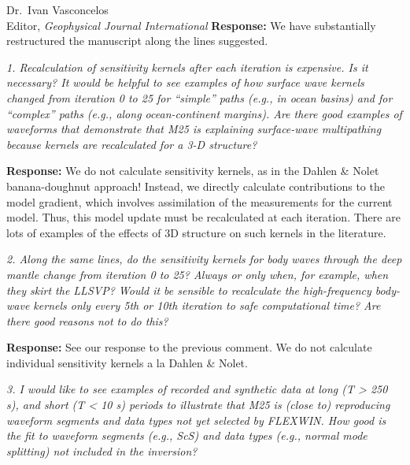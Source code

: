 \documentclass[11pt,a4paper]{letter}
\newcommand{\cyan}[1]{\textbf{\textcolor{Cyan}{#1}}}
\newcommand{\orange}[1]{\textbf{\textcolor{Orange}{#1}}}
\newcommand{\toebru}[1]{\textbf{\cyan{*** Ebru: #1 ***}}}
\newcommand{\fromebru}[1]{\textbf{\orange{*** Ebru: #1 ***}}}
\newcommand{\response}[1]{\textbf{Response:} #1}
\newcommand{\rev}[1]{{\it{#1}}}
\begin{document}
\begin{letter}{Dr.~Ivan Vasconcelos\\
Editor, \textit{Geophysical Journal International}}
\response{We have substantially restructured the manuscript along the lines suggested.}

\rev{1. Recalculation of sensitivity kernels after each iteration is expensive. Is it necessary?
It would be helpful to see examples of how surface wave kernels changed from iteration 0 to 25 for ``simple'' paths (e.g., in ocean basins) and for ``complex'' paths (e.g., along ocean-continent margins). Are there good examples of waveforms that demonstrate that M25 is explaining surface-wave multipathing because kernels are recalculated for a 3-D structure?
}

\response{We do not calculate sensitivity kernels, as in the Dahlen \& Nolet banana-doughnut approach! Instead, we directly calculate contributions to the model gradient, which involves assimilation of the measurements for the current model. Thus, this model update must be recalculated at each iteration.
There are lots of examples of the effects of 3D structure on such kernels in the literature.}

\rev{2. Along the same lines, do the sensitivity kernels for body waves through the deep mantle change from iteration 0 to 25? Always or only when, for example, when they skirt the LLSVP? Would it be sensible to recalculate the high-frequency body-wave kernels only every 5th or 10th iteration to safe computational time? Are there good reasons not to do this?
}

\response{See our response to the previous comment. We do not calculate individual sensitivity kernels a la Dahlen \& Nolet.
}

\rev{3. I would like to see examples of recorded and synthetic data at long (T > 250 s), and short (T < 10 s) periods to illustrate that M25 is (close to) reproducing waveform segments and data types not yet selected by FLEXWIN. How good is the fit to waveform segments (e.g., ScS) and data types (e.g., normal mode splitting) not included in the inversion?
}


\end{letter}
\end{document}
